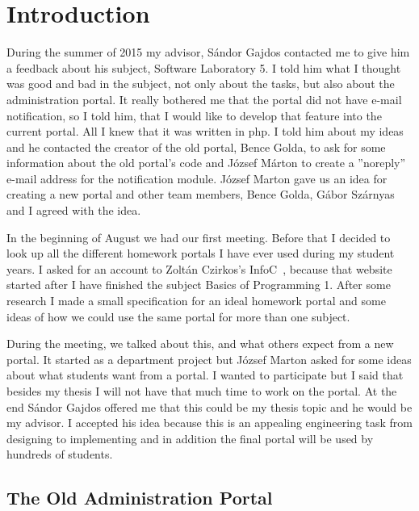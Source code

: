 \chapter{Introduction}

During the summer of 2015 my advisor, Sándor Gajdos contacted me to give him a feedback about his subject, Software Laboratory 5. I told him what I thought was good and bad in the subject, not only about the tasks, but also about the administration portal. It really bothered me that the portal did not have e-mail notification, so I told him, that I would like to develop that feature into the current portal. All I knew that it was written in php. I told him about my ideas and he contacted the creator of the old portal, Bence Golda, to ask for some information about the old portal's code and József Márton to create a ''noreply'' e-mail address for the notification module. József Marton gave us an idea for creating a new portal and other team members, Bence Golda, Gábor Szárnyas and I agreed with the idea. 

In the beginning of August we had our first meeting. Before that I decided to look up all the different homework portals I have ever used during my student years. I asked for an account to Zoltán Czirkos's InfoC~\cite{InfoC}, because that website started after I have finished the subject Basics of Programming 1. After some research I made a small specification for an ideal homework portal and some ideas of how we could use the same portal for more than one subject.

During the meeting, we talked about this, and what others expect from a new portal. It started as a department project but József Marton asked for some ideas about what students want from a portal. I wanted to participate but I said that besides my thesis I will not have that much time to work on the portal. At the end Sándor Gajdos offered me that this could be my thesis topic and he would be my advisor. I accepted his idea because this is an appealing engineering task from designing to implementing and in addition the final portal will be used by hundreds of students.


\section{The Old Administration Portal} 

